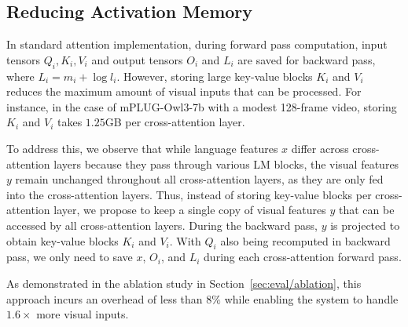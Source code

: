 \subsection{Reducing Activation Memory} In standard attention implementation, during forward pass computation, input tensors $Q_i, K_i, V_i$ and output tensors $O_i$ and $L_i$ are saved for backward pass, where $L_i = m_i + \log{l_i}$. However, storing large key-value blocks $K_i$ and $V_i$ reduces the maximum amount of visual inputs that can be processed. For instance, in the case of mPLUG-Owl3-7b with a modest 128-frame video, storing $K_i$ and $V_i$ takes $1.25$GB per cross-attention layer.

To address this, we observe that while language features $x$ differ across cross-attention layers because they pass through various LM blocks, the visual features $y$ remain unchanged throughout all cross-attention layers, as they are only fed into the cross-attention layers. Thus, instead of storing key-value blocks per cross-attention layer, we propose to keep a single copy of visual features $y$ that can be accessed by all cross-attention layers. During the backward pass, $y$ is projected to obtain key-value blocks $K_i$ and $V_i$. With $Q_i$ also being recomputed in backward pass, we only need to save $x$, $O_i$, and $L_i$ during each cross-attention forward pass.

As demonstrated in the ablation study in Section~\ref{sec:eval/ablation}, this approach incurs an overhead of less than $8\%$ while enabling the system to handle $1.6\times$ more visual inputs.



